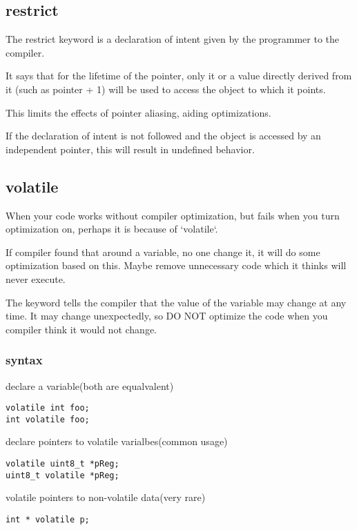 \subsection{restrict}
The restrict keyword is a declaration of intent given by the programmer to the compiler.

It says that for the lifetime of the pointer,
only it or a value directly derived from it (such as pointer + 1)
will be used to access the object to which it points.

This limits the effects of pointer aliasing, aiding optimizations.

If the declaration of intent is not followed
and the object is accessed by an independent pointer,
this will result in undefined behavior.



\subsection{volatile}
When your code works without compiler optimization, but fails when you turn optimization on,
perhaps it is because of `volatile`.

If compiler found that around a variable, no one change it, it will do some optimization based on this.
Maybe remove unnecessary code which it thinks will never execute.

The keyword tells the compiler that the value of the variable may change at any time.
It may change unexpectedly,
so DO NOT optimize the code when you compiler think it would not change.

\subsubsection{syntax}

declare a variable(both are equalvalent)

\begin{lstlisting}
volatile int foo;
int volatile foo;
\end{lstlisting}

declare pointers to volatile varialbes(common usage)

\begin{lstlisting}
volatile uint8_t *pReg;
uint8_t volatile *pReg;
\end{lstlisting}

volatile pointers to non-volatile data(very rare)

\begin{lstlisting}
int * volatile p;
\end{lstlisting}

